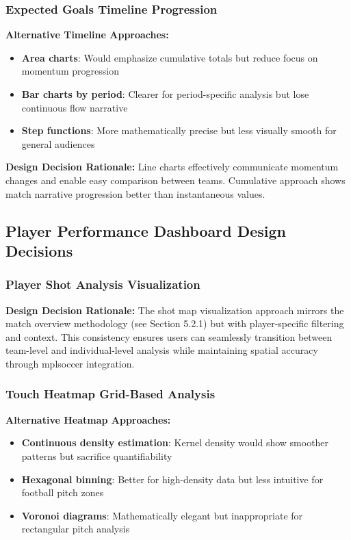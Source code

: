 \documentclass[12pt,a4paper]{article}
\begin{document}
\subsubsection{Expected Goals Timeline Progression}
\textbf{Alternative Timeline Approaches:}
\begin{itemize}
    \item \textbf{Area charts}: Would emphasize cumulative totals but reduce focus on momentum progression
    \item \textbf{Bar charts by period}: Clearer for period-specific analysis but lose continuous flow narrative
    \item \textbf{Step functions}: More mathematically precise but less visually smooth for general audiences
\end{itemize}

\textbf{Design Decision Rationale:}
Line charts effectively communicate momentum changes and enable easy comparison between teams. Cumulative approach shows match narrative progression better than instantaneous values.

\subsection{Player Performance Dashboard Design Decisions}

\subsubsection{Player Shot Analysis Visualization}
\textbf{Design Decision Rationale:}
The shot map visualization approach mirrors the match overview methodology (see Section 5.2.1) but with player-specific filtering and context. This consistency ensures users can seamlessly transition between team-level and individual-level analysis while maintaining spatial accuracy through mplsoccer integration.

\subsubsection{Touch Heatmap Grid-Based Analysis}
\textbf{Alternative Heatmap Approaches:}
\begin{itemize}
    \item \textbf{Continuous density estimation}: Kernel density would show smoother patterns but sacrifice quantifiability
    \item \textbf{Hexagonal binning}: Better for high-density data but less intuitive for football pitch zones
    \item \textbf{Voronoi diagrams}: Mathematically elegant but inappropriate for rectangular pitch analysis
\end{itemize}
\end{document}
